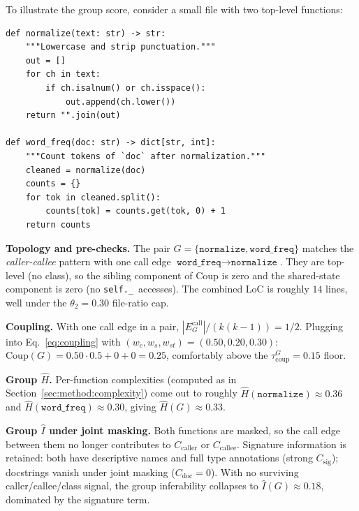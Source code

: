 To illustrate the group score, consider a small file with two
top-level functions:

\begin{center}\small
\begin{minipage}{0.82\linewidth}
\begin{verbatim}
def normalize(text: str) -> str:
    """Lowercase and strip punctuation."""
    out = []
    for ch in text:
        if ch.isalnum() or ch.isspace():
            out.append(ch.lower())
    return "".join(out)

def word_freq(doc: str) -> dict[str, int]:
    """Count tokens of `doc` after normalization."""
    cleaned = normalize(doc)
    counts = {}
    for tok in cleaned.split():
        counts[tok] = counts.get(tok, 0) + 1
    return counts
\end{verbatim}
\end{minipage}
\end{center}

\textbf{Topology and pre-checks.} The pair
$G\!=\!\{\texttt{normalize}, \texttt{word\_freq}\}$ matches the
\emph{caller-callee} pattern with one call edge
$\texttt{word\_freq}\!\to\!\texttt{normalize}$. They are top-level
(no class), so the sibling component of $\mathrm{Coup}$ is zero and
the shared-state component is zero (no \texttt{self.\_}~accesses). The
combined LoC is roughly $14$ lines, well under the $\theta_2\!=\!0.30$
file-ratio cap.

\textbf{Coupling.} With one call edge in a pair,
$|E^{\text{call}}_G|/(k(k\!-\!1))=1/2$. Plugging into
Eq.~\ref{eq:coupling} with $(w_c,w_s,w_{st})=(0.50,0.20,0.30)$:
$\mathrm{Coup}(G)=0.50\cdot 0.5+0+0=0.25$, comfortably above the
$\tau^G_{\mathrm{coup}}=0.15$ floor.

\textbf{Group $\hat{H}$.} Per-function complexities (computed as in
Section~\ref{sec:method:complexity}) come out to roughly
$\hat{H}(\texttt{normalize})\!\approx\!0.36$ and
$\hat{H}(\texttt{word\_freq})\!\approx\!0.30$,
giving $\hat{H}(G)\!\approx\!0.33$.

\textbf{Group $\hat{I}$ under joint masking.} Both functions are
masked, so the call edge between them no longer contributes to
$C_{\mathrm{caller}}$ or $C_{\mathrm{callee}}$. Signature information
is retained: both have descriptive names and full type annotations
(strong $C_{\mathrm{sig}}$); docstrings vanish under joint masking
($C_{\mathrm{doc}}=0$). With no surviving caller/callee/class signal,
the group inferability collapses to $\hat{I}(G)\!\approx\!0.18$,
dominated by the signature term.

